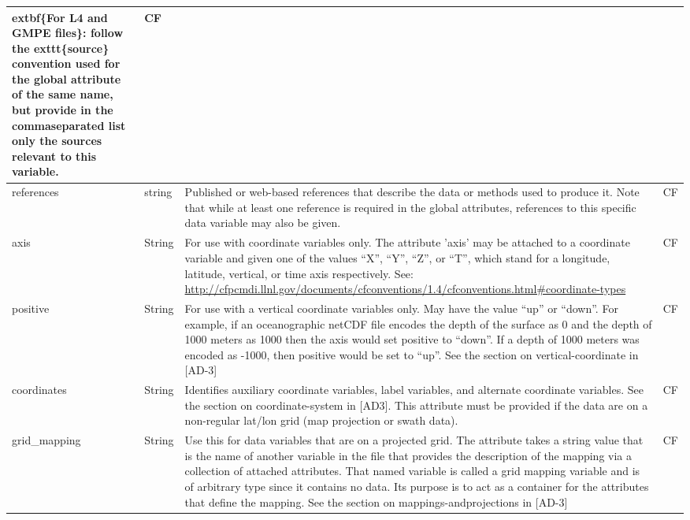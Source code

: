 \begin{longtable}{|p{}|p{}|p{}|p{}|}
\hspace{0.5cm}extbf\{For L4 and GMPE files\}: follow the \hspace{0.5cm}exttt\{source\}
convention used for the global attribute of the
same name, but provide in the commaseparated list only the sources relevant to this
variable. & CF \\ \hline

\rowcolor{LightCyan} references & string & Published or web-based references that describe the data or methods used to produce it. Note that while at least one reference is required in the global attributes, references to this specific data variable may also be given. & CF \\ \hline

\rowcolor{LightCyan} axis & String & For use with coordinate variables only. The attribute 'axis' may be attached to a coordinate variable and given one of the values “X”, “Y”, “Z”, or “T”, which stand for a longitude, latitude, vertical, or time axis respectively. See: \url{http://cfpcmdi.llnl.gov/documents/cfconventions/1.4/cfconventions.html#coordinate-types} & CF \\ \hline

\rowcolor{LightCyan} positive & String & For use with a vertical coordinate variables
only. May have the value “up” or “down”. For
example, if an oceanographic netCDF file
encodes the depth of the surface as 0 and the
depth of 1000 meters as 1000 then the axis
would set positive to “down”. If a depth of
1000 meters was encoded as -1000, then
positive would be set to “up”. See the section
on vertical-coordinate in [AD-3] & CF \\ \hline

\rowcolor{LightCyan} coordinates & String & Identifies auxiliary coordinate variables, label variables, and alternate coordinate variables. See the section on coordinate-system in [AD3]. This attribute must be provided if the data are on a non-regular lat/lon grid (map projection or swath data). & CF \\ \hline

\rowcolor{LightCyan} grid\_mapping & String & Use this for data variables that are on a projected grid. The attribute takes a string value that is the name of another variable in the file that provides the description of the mapping via a collection of attached attributes. That named variable is called a grid mapping variable and is of arbitrary type since it contains no data. Its purpose is to act as a container for the attributes that define the mapping. See the section on mappings-andprojections in [AD-3] & CF \\ \hline


\end{longtable}
